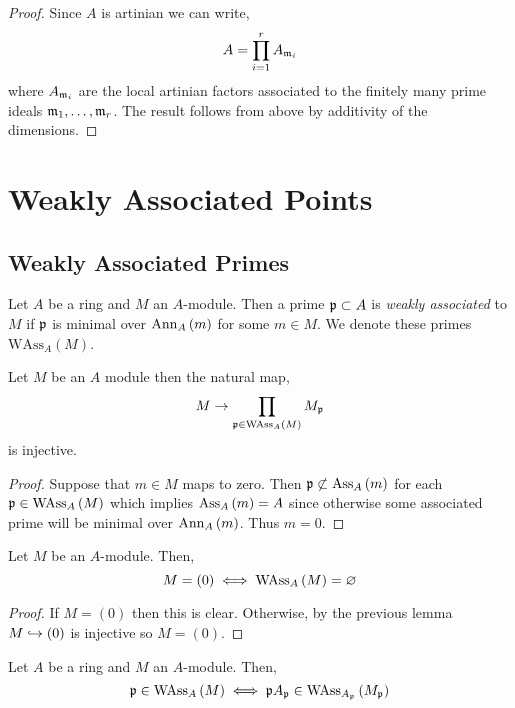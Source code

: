 \documentclass[12pt]{article}
\begin{document}
\begin{proof}
Since $A$ is artinian we can write,
\[ A = \prod_{i = 1}^r A_{\mathfrak{m}_i} \]
where $A_{\mathfrak{m}_i}$ are the local artinian factors associated to the finitely many prime ideals $\mathfrak{m}_1, \dots, \mathfrak{m}_r$. The result follows from above by additivity of the dimensions.
\end{proof}

\section{Weakly Associated Points}

\newcommand{\WAss}[2]{\mathrm{WAss}_{#1}\left(#2 \right)}

\subsection{Weakly Associated Primes}

\begin{defn}
Let $A$ be a ring and $M$ an $A$-module. Then a prime $\mathfrak{p} \subset A$ is \textit{weakly associated} to $M$ if $\mathfrak{p}$ is minimal over $\mathrm{Ann}_{A}\left(m\right)$ for some $m \in M$. We denote these primes $\WAss{A}{M}$.
\end{defn}

\begin{lemma}
Let $M$ be an $A$ module then the natural map,
\[ M \to \prod_{\p \in \WAss{A}{M}} M_\p \]
is injective.
\end{lemma}

\begin{proof}
Suppose that $m \in M$ maps to zero. Then $\mathfrak{p} \not\subset \mathrm{Ass}_{A}\left( m \right)$ for each $\p \in \WAss{A}{M}$ which implies $\mathrm{Ass}_{A}\left( m \right) = A$ since otherwise some associated prime will be minimal over $\mathrm{Ann}_{A}\left(m\right)$. Thus $m = 0$.
\end{proof}

\begin{lemma}
Let $M$ be an $A$-module. Then,
\[ M = (0) \iff \WAss{A}{M} = \empty \]
\end{lemma}

\begin{proof}
If $M = (0)$ then this is clear. Otherwise, by the previous lemma $M \hookrightarrow (0)$ is injective so $M = (0)$. 
\end{proof}

\begin{lemma} \label{weak_ass_primes_localization}
Let $A$ be a ring and $M$ an $A$-module. Then,
\[ \p \in \WAss{A}{M} \iff \p A_\p \in \WAss{A_\p}{M_\p} \]
\end{lemma}
\end{document}
